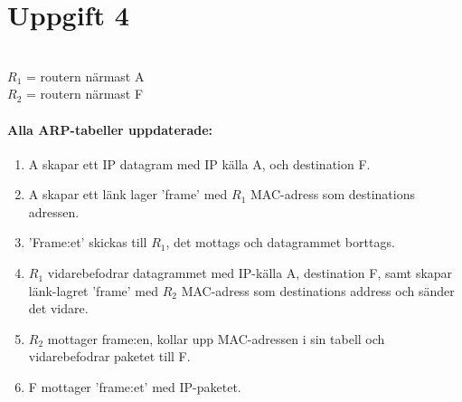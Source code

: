 \section{Uppgift 4}
\\ $R_1$ = routern närmast A
\\ $R_2$ = routern närmast F

\paragraph{Alla ARP-tabeller uppdaterade:}
\begin{enumerate}
    \item A skapar ett IP datagram med IP källa A, och destination F.
    \item A skapar ett länk lager 'frame' med $R_1$ MAC-adress som destinations adressen.
    \item 'Frame:et' skickas till $R_1$, det mottags och datagrammet borttags.
    \item $R_1$ vidarebefodrar datagrammet med IP-källa A, destination F, samt skapar länk-lagret
	'frame' med $R_2$ MAC-adress som destinations address och sänder det vidare.
    \item $R_2$ mottager frame:en, kollar upp MAC-adressen i sin tabell och vidarebefodrar
	paketet till F. 
    \item F mottager 'frame:et' med IP-paketet.

\end{enumerate}
